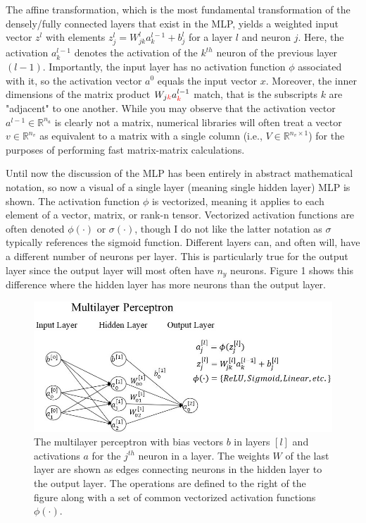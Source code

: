 \documentclass{article}
\newcommand{\colorvar}[2]{
	\begingroup\color{#1}{#2}\endgroup
}
\begin{document}
The affine transformation, which is the most fundamental transformation
of the densely/fully connected layers that exist in the MLP, yields
a weighted input vector $z^{l}$ with elements
$z_j^{l} = W_{jk}^{l} a_{k}^{l-1} + b_{j}^{l}$ for a layer $l$ and neuron $j$.
Here, the activation $a_k^{l-1}$ denotes the activation of the $k^{th}$ neuron of the
previous layer $(l-1)$. Importantly, the input layer has no activation function $\phi$
associated with it, so the activation vector $a^{0}$ equals the input vector $x$.
Moreover, the inner dimensions of the matrix product
$W_{j \colorvar{red}{k}} a_{\colorvar{red}{k}}^{l-1}$ match, that is the subscripts $k$ are "adjacent" to one another. While you may
observe that the activation vector $a^{l-1} \in \mathbb{R}^{n_a}$ is clearly not a matrix,
numerical libraries will often treat a vector $v \in \mathbb{R}^{n_v}$ as equivalent
to a matrix with a single column (i.e., $V \in \mathbb{R}^{n_v \times 1}$) for
the purposes of performing fast matrix-matrix calculations.

Until now the discussion of the MLP has been entirely in abstract mathematical
notation, so now a visual of a single layer (meaning single hidden layer)
MLP is shown. The activation function $\phi$ is vectorized, meaning it
applies to each element of a vector, matrix, or rank-n tensor. Vectorized
activation functions are often denoted $\phi(\cdot)$ or $\sigma(\cdot)$, though I do not like
the latter notation as $\sigma$ typically references the sigmoid function. Different
layers can, and often will, have a different number of neurons per layer. This
is particularly true for the output layer since the output layer will most
often have $n_y$ neurons. Figure 1 shows this difference where the hidden layer
has more neurons than the output layer.

\begin{figure}[h]
	\includegraphics[scale=0.60]{mlp_larger_font_croppped.jpg}
	\caption{The multilayer perceptron with bias vectors $b$ in layers
		$[l]$ and activations $a$ for the $j^{th}$ neuron in a layer. The weights
		$W$ of the last layer are shown as edges connecting neurons in the hidden
		layer to the output layer. The operations are defined to the right
		of the figure along with a set of
		common vectorized activation functions $\phi(\cdot)$.}
\end{figure}
\end{document}

